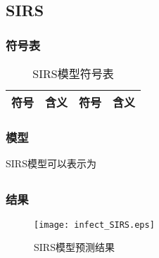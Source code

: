 \subsection{SIRS}
\subsubsection{符号表}
\begin{table}[H]
	\centering
	\caption{SIRS模型符号表}
	\begin{tabular}{llll}
		\hline
		符号&含义&符号&含义\\
		\hline
		\hline
	\end{tabular}
\end{table}
\subsubsection{模型}
	SIRS模型可以表示为
	\begin{align}
	\end{align}
\subsubsection{结果}
	\begin{figure}[H]
		\centering
		\texttt{[image: infect\_SIRS.eps]}
		\caption{SIRS模型预测结果}
	\end{figure}